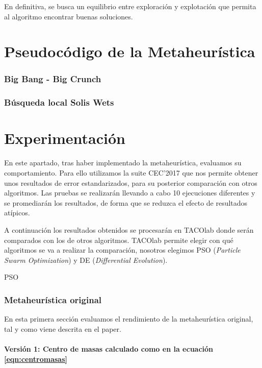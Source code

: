 En definitiva, se busca un equilibrio entre exploración y explotación que permita al algoritmo encontrar buenas soluciones.

\part{Pseudocódigo de la Metaheurística}

\section{Big Bang - Big Crunch}

\section{Búsqueda local Solis Wets}





\part{Experimentación}
En este apartado, tras haber implementado la metaheurística, evaluamos su comportamiento. Para ello utilizamos la suite CEC'2017 que nos permite obtener unos resultados de error estandarizados, para su posterior comparación con otros algoritmos. Las pruebas se realizarán llevando a cabo 10 ejecuciones diferentes y se promediarán los resultados, de forma que se reduzca el efecto de resultados atípicos. 

A continuación los resultados obtenidos se procesarán en TACOlab \cite{tacolab} donde serán comparados con los de otros algoritmos. TACOlab permite elegir con qué algoritmos se va a realizar la comparación, nosotros elegimos PSO (\textit{Particle Swarm Optimization}) y DE (\textit{Differential Evolution}).

PSO 


\section{Metaheurística original}
En esta primera sección evaluamos el rendimiento de la metaheurística original, tal y como viene descrita en el paper. 

\subsection{Versión 1: Centro de masas calculado como en la ecuación \ref{eqn:centromasas}}

